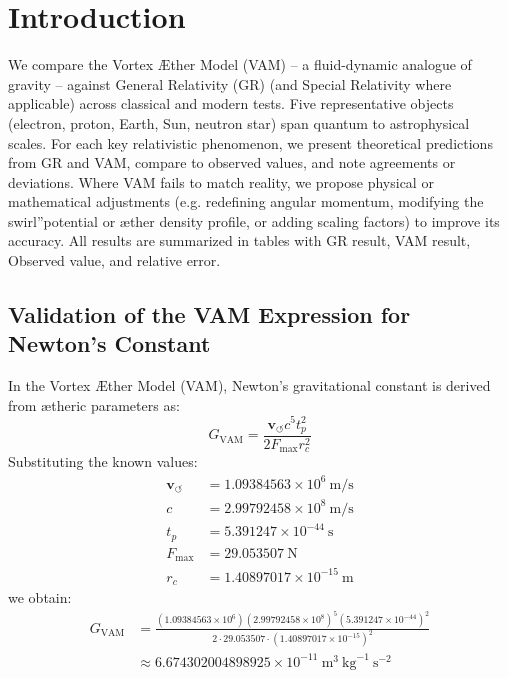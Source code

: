 
\section*{Introduction}
We compare the Vortex Æther Model (VAM) – a fluid-dynamic analogue of gravity – against General Relativity (GR) (and Special Relativity where applicable) across classical and modern tests. Five representative objects (electron, proton, Earth, Sun, neutron star) span quantum to astrophysical scales. For each key relativistic phenomenon, we present theoretical predictions from GR and VAM, compare to observed values, and note agreements or deviations. Where VAM fails to match reality, we propose physical or mathematical adjustments (e.g. redefining angular momentum, modifying the \grqq swirl\textquotedblright potential or æther density profile, or adding scaling factors) to improve its accuracy. All results are summarized in tables with GR result, VAM result, Observed value, and relative error.

\subsection*{Validation of the VAM Expression for Newton's Constant}

In the Vortex Æther Model (VAM), Newton's gravitational constant is derived from ætheric parameters as:
\begin{equation}
G_\text{VAM} = \frac{\mathbf{v}_{\scriptscriptstyle\boldsymbol{\circlearrowleft}} c^5 t_p^2}{2 F_{\max} r_c^2}
\end{equation}
Substituting the known values:
\begin{align*}
\mathbf{v}_{\scriptscriptstyle\boldsymbol{\circlearrowleft}} &= 1.09384563 \times 10^6 \ \text{m/s} \\
c &= 2.99792458 \times 10^8 \ \text{m/s} \\
t_p &= 5.391247 \times 10^{-44} \ \text{s} \\
F_{\max} &= 29.053507 \ \text{N} \\
r_c &= 1.40897017 \times 10^{-15} \ \text{m}
\end{align*}
we obtain:
\begin{align*}
G_\text{VAM} &= \frac{(1.09384563 \times 10^6)(2.99792458 \times 10^8)^5 (5.391247 \times 10^{-44})^2}{2 \cdot 29.053507 \cdot (1.40897017 \times 10^{-15})^2} \\
&\approx 6.674302004898925 \times 10^{-11} \ \text{m}^3 \ \text{kg}^{-1} \ \text{s}^{-2}
\end{align*}

